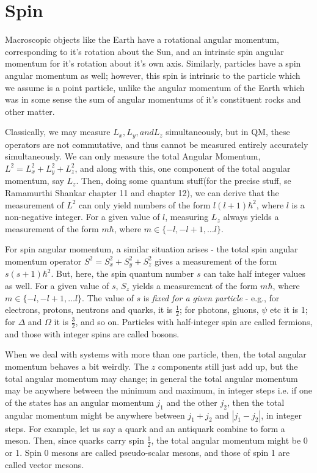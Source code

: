 \documentclass[11pt]{book}
\begin{document}
\section{Spin}
Macroscopic objects like the Earth have a rotational angular momentum, corresponding to it's rotation about the Sun, and an intrinsic spin angular momentum for it's rotation about it's own axis. Similarly, particles have a spin angular momentum as well; however, this spin is intrinsic to the particle which we assume is a point particle, unlike the angular momentum of the Earth which was in some sense the sum of angular momentums of it's constituent rocks and other matter. 

Classically, we may measure $L_x, L_y, and L_z$ simultaneously, but in QM, these operators are not commutative, and thus cannot be measured entirely accurately simultaneously. We can only measure the total Angular Momentum, $L^2 = L_x^2 + L_y^2 + L_z^2$, and along with this, one component of the total angular momentum, say $L_z$. Then, doing some quantum stuff(for the precise stuff, se Ramamurthi Shankar chapter 11 and chapter 12), we can derive that the measurement of $L^2$ can only yield numbers of the form $l(l+1)\hbar^2$, where $l$ is a non-negative integer. For a given value of $l$, measuring $L_z$ always yields a measurement of the form $m\hbar$, where $m \in \{-l,-l+1,\ldots l\}$.

For spin angular momentum, a similar situation arises - the total spin angular momentum operator $S^2 = S_x^2 + S_y^2 + S_z^2$ gives a measurement of the form $s(s+1)\hbar^2$. But, here, the spin quantum number $s$ can take half integer values as well. For a given value of $s$, $S_z$ yields a measurement of the form $m\hbar$, where $m \in \{-l,-l+1,\ldots l\}$. The value of $s$ is \emph{fixed for a given particle} - e.g., for electrons, protons, neutrons and quarks, it is $\frac{1}{2}$; for photons, gluons, $\psi$ etc it is 1; for $\Delta$ and $\Omega$ it is $\frac{3}{2}$, and so on. Particles with half-integer spin are called fermions, and those with integer spins are called bosons.

When we deal with systems with more than one particle, then, the total angular momentum behaves a bit weirdly. The $z$ components still just add up, but the total angular momentum may change; in general the total angular momentum may be anywhere between the minimum and maximum, in integer steps i.e. if one of the states has an angular momentum $j_1$ and the other $j_2$, then the total angular momentum might be anywhere between $j_1+j_2$ and $|j_1 - j_2|$, in integer steps. For example, let us say a quark and an antiquark combine to form a meson. Then, since quarks carry spin $\frac{1}{2}$, the total angular momentum might be 0 or 1. Spin 0 mesons are called pseudo-scalar mesons, and those of spin 1 are called vector mesons.
\end{document}
